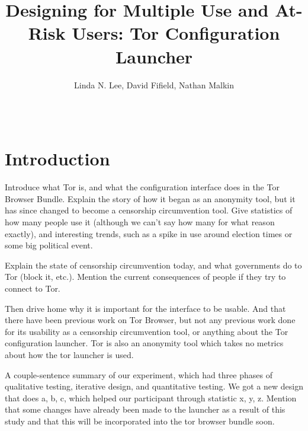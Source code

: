 \documentclass{template}
\begin{document}
\title{Designing for Multiple Use and At-Risk Users: Tor Configuration Launcher}
\author{
 \alignauthor Linda N. Lee, David Fifield, Nathan Malkin \\
   \vspace{0.5em}
    \\
   \\
}
\maketitle

\begin{abstract}

\end{abstract}


\section{Introduction}
Introduce what Tor is, and what the configuration interface does in the Tor Browser Bundle. Explain the story of how it began as an anonymity tool, but it has since changed to become a censorship circumvention tool. Give statistics of how many people use it (although we can't say how many for what reason exactly), and interesting trends, such as a spike in use around election times or some big political event. 

Explain the state of censorship circumvention today, and what governments do to Tor (block it, etc.). Mention the current consequences of people if they try to connect to Tor.

Then drive home why it is important for the interface to be usable. And that there have been previous work on Tor Browser, but not any previous work done for its usability as a censorship circumvention tool, or anything about the Tor configuration launcher. Tor is also an anonymity tool which takes no metrics about how the tor launcher is used.

A couple-sentence summary of our experiment, which had three phases of qualitative testing, iterative design, and quantitative testing. We got a new design that does a, b, c, which helped our participant through statistic x, y, z. Mention that some changes have already been made to the launcher as a result of this study and that this will be incorporated into the tor browser bundle soon. 
\end{document}
